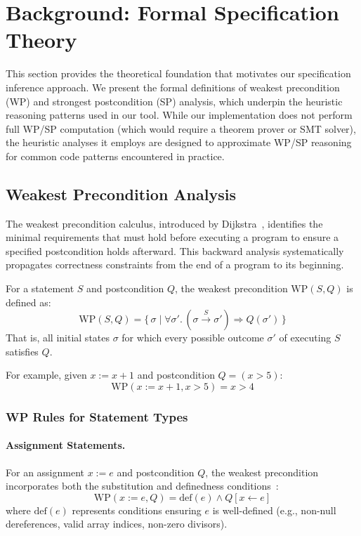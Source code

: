 \section{Background: Formal Specification Theory}
\label{sec:background}

This section provides the theoretical foundation that motivates our specification inference approach. We present the formal definitions of weakest precondition (WP) and strongest postcondition (SP) analysis, which underpin the heuristic reasoning patterns used in our tool. While our implementation does not perform full WP/SP computation (which would require a theorem prover or SMT solver), the heuristic analyses it employs are designed to approximate WP/SP reasoning for common code patterns encountered in practice.

\subsection{Weakest Precondition Analysis}
\label{subsec:wp-theory}

The weakest precondition calculus, introduced by Dijkstra~\cite{dijkstra_guarded_1975}, identifies the minimal requirements that must hold before executing a program to ensure a specified postcondition holds afterward. This backward analysis systematically propagates correctness constraints from the end of a program to its beginning.

\begin{definition}
For a statement $S$ and postcondition $Q$, the weakest precondition $\text{WP}(S, Q)$ is defined as:
\[
\text{WP}(S, Q) = \{\, \sigma \mid \forall \sigma'.\, (\sigma \xrightarrow{S} \sigma') \Rightarrow Q(\sigma') \,\}
\]
That is, all initial states $\sigma$ for which every possible outcome $\sigma'$ of executing $S$ satisfies $Q$.
\end{definition}

For example, given $x := x + 1$ and postcondition $Q = (x > 5)$:
\[
\text{WP}(x := x + 1, x > 5) = x > 4
\]

\subsubsection{WP Rules for Statement Types}

\paragraph{Assignment Statements.}
For an assignment $x := e$ and postcondition $Q$, the weakest precondition incorporates both the substitution and definedness conditions~\cite{dijkstra1976discipline, morgan_programming_1990}:
\[
\text{WP}(x := e, Q) = \text{def}(e) \land Q[x \leftarrow e]
\]
where $\text{def}(e)$ represents conditions ensuring $e$ is well-defined (e.g., non-null dereferences, valid array indices, non-zero divisors).

